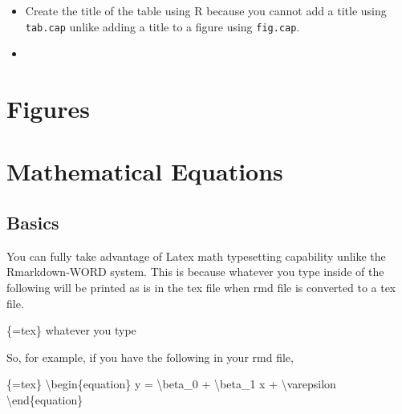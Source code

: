 \documentclass[
  letterpaper,
  DIV=11,
  numbers=noendperiod]{scrreprt}
\newenvironment{Shaded}{\begin{snugshade}}{\end{snugshade}}
\newcommand{\NormalTok}[1]{\textcolor[rgb]{0.00,0.23,0.31}{#1}}
\providecommand{\tightlist}{%
  \setlength{\itemsep}{0pt}\setlength{\parskip}{0pt}}\usepackage{longtable,booktabs,array}
\begin{document}
\begin{itemize}
\tightlist
\item
  Create the title of the table using R because you cannot add a title
  using \texttt{tab.cap} unlike adding a title to a figure using
  \texttt{fig.cap}.
\item
\end{itemize}

\hypertarget{figures}{%
\section{Figures}\label{figures}}

\hypertarget{mathematical-equations-1}{%
\section{Mathematical Equations}\label{mathematical-equations-1}}

\hypertarget{basics}{%
\subsection{Basics}\label{basics}}

You can fully take advantage of Latex math typesetting capability unlike
the Rmarkdown-WORD system. This is because whatever you type inside of
the following will be printed as is in the tex file when rmd file is
converted to a tex file.

\begin{Shaded}
\begin{Highlighting}[]
\NormalTok{\textasciigrave{}\textasciigrave{}\textasciigrave{}\{=tex\}}
\NormalTok{whatever you type}
\NormalTok{\textasciigrave{}\textasciigrave{}\textasciigrave{}}
\end{Highlighting}
\end{Shaded}

So, for example, if you have the following in your rmd file,

\begin{Shaded}
\begin{Highlighting}[]
\NormalTok{\textasciigrave{}\textasciigrave{}\textasciigrave{}\{=tex\}}
\NormalTok{\textbackslash{}begin\{equation\}}
\NormalTok{y = \textbackslash{}beta\_0 + \textbackslash{}beta\_1 x + \textbackslash{}varepsilon}
\NormalTok{\textbackslash{}end\{equation\}}
\NormalTok{\textasciigrave{}\textasciigrave{}\textasciigrave{}}
\end{Highlighting}
\end{Shaded}
\end{document}

